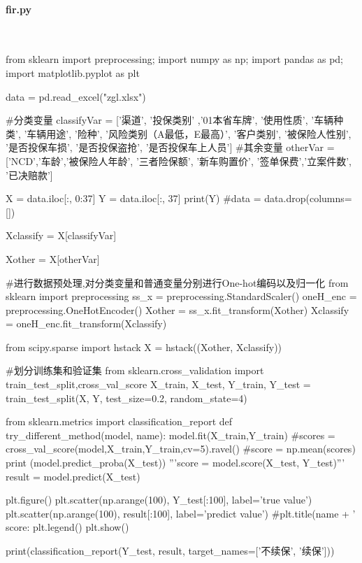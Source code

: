 \documentclass[a4paper]{article}
\begin{document}
	\paragraph{fir.py}\\
		\begin{python}
			from sklearn import preprocessing;
			import numpy as np;
			import pandas as pd;
			import matplotlib.pyplot as plt
			
			
			data = pd.read_excel("zgl.xlsx")
			
			#分类变量
			classifyVar = ['渠道', '投保类别' ,'01本省车牌', '使用性质', '车辆种类', '车辆用途',
			'险种',  '风险类别（A最低，E最高）', '客户类别', '被保险人性别', 
			'是否投保车损', '是否投保盗抢', '是否投保车上人员']
			#其余变量
			otherVar = ['NCD','车龄','被保险人年龄', '三者险保额',  '新车购置价', '签单保费','立案件数', '已决赔款']
			
			X = data.iloc[:, 0:37]
			Y = data.iloc[:, 37]
			print(Y)
			#data = data.drop(columns=[])
			
			Xclassify = X[classifyVar]
			
			Xother = X[otherVar]
			
			
			#进行数据预处理,对分类变量和普通变量分别进行One-hot编码以及归一化
			from sklearn import preprocessing
			ss_x = preprocessing.StandardScaler()
			oneH_enc = preprocessing.OneHotEncoder()
			Xother = ss_x.fit_transform(Xother)
			Xclassify = oneH_enc.fit_transform(Xclassify)
			
			from scipy.sparse import hstack
			X = hstack((Xother, Xclassify))
			
			#划分训练集和验证集
			from sklearn.cross_validation import train_test_split,cross_val_score
			X_train, X_test, Y_train, Y_test = train_test_split(X, Y, test_size=0.2,  random_state=4)
			
			from sklearn.metrics import classification_report
			def try_different_method(model, name):
			model.fit(X_train,Y_train)
			#scores = cross_val_score(model,X_train,Y_train,cv=5).ravel()
			#score = np.mean(scores)
			print (model.predict_proba(X_test))
			'''score = model.score(X_test, Y_test)'''
			result = model.predict(X_test)
			
			plt.figure()
			plt.scatter(np.arange(100),  Y_test[:100],  label='true value')
			plt.scatter(np.arange(100), result[:100],  label='predict value')
			#plt.title(name + ' score: %
			plt.legend()
			plt.show()
			
			print(classification_report(Y_test, result, target_names=['不续保', '续保']))
			

\end{python}
\end{document}
